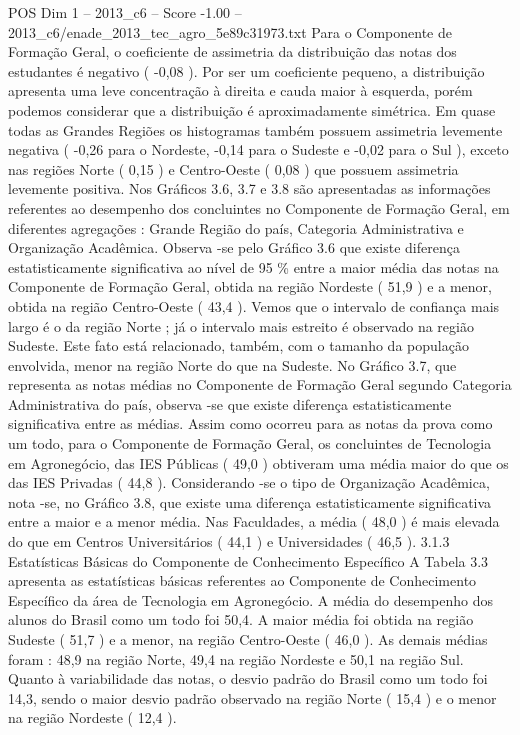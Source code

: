 \begin{textsample}{POS Dim 1 – 2013\_c6 – Score -1.00 – 2013\_c6/enade\_2013\_tec\_agro\_5e89c31973.txt}
Para o Componente de Formação Geral, o coeficiente de assimetria da distribuição das notas dos estudantes é negativo ( -0,08 ).
Por ser um coeficiente pequeno, a distribuição apresenta uma leve concentração à direita e cauda maior à esquerda, porém podemos considerar que a distribuição é aproximadamente simétrica.
Em quase todas as Grandes Regiões os histogramas também possuem assimetria levemente negativa ( -0,26 para o Nordeste, -0,14 para o Sudeste e -0,02 para o Sul ), exceto nas regiões Norte ( 0,15 ) e Centro-Oeste ( 0,08 ) que possuem assimetria levemente positiva.
Nos Gráficos 3.6, 3.7 e 3.8 são apresentadas as informações referentes ao desempenho dos concluintes no Componente de Formação Geral, em diferentes agregações : Grande Região do país, Categoria Administrativa e Organização Acadêmica.
Observa -se pelo Gráfico 3.6 que existe diferença estatisticamente significativa ao nível de 95 \% entre a maior média das notas na Componente de Formação Geral, obtida na região Nordeste ( 51,9 ) e a menor, obtida na região Centro-Oeste ( 43,4 ).
Vemos que o intervalo de confiança mais largo é o da região Norte ; já o intervalo mais estreito é observado na região Sudeste.
Este fato está relacionado, também, com o tamanho da população envolvida, menor na região Norte do que na Sudeste.
No Gráfico 3.7, que representa as notas médias no Componente de Formação Geral segundo Categoria Administrativa do país, observa -se que existe diferença estatisticamente significativa entre as médias.
Assim como ocorreu para as notas da prova como um todo, para o Componente de Formação Geral, os concluintes de Tecnologia em Agronegócio, das IES Públicas ( 49,0 ) obtiveram uma média maior do que os das IES Privadas ( 44,8 ).
Considerando -se o tipo de Organização Acadêmica, nota -se, no Gráfico 3.8, que existe uma diferença estatisticamente significativa entre a maior e a menor média.
Nas Faculdades, a média ( 48,0 ) é mais elevada do que em Centros Universitários ( 44,1 ) e Universidades ( 46,5 ). 3.1.3 Estatísticas Básicas do Componente de Conhecimento Específico A Tabela 3.3 apresenta as estatísticas básicas referentes ao Componente de Conhecimento Específico da área de Tecnologia em Agronegócio.
A média do desempenho dos alunos do Brasil como um todo foi 50,4.
A maior média foi obtida na região Sudeste ( 51,7 ) e a menor, na região Centro-Oeste ( 46,0 ).
As demais médias foram : 48,9 na região Norte, 49,4 na região Nordeste e 50,1 na região Sul.
Quanto à variabilidade das notas, o desvio padrão do Brasil como um todo foi 14,3, sendo o maior desvio padrão observado na região Norte ( 15,4 ) e o menor na região Nordeste ( 12,4 ).

\end{textsample}
